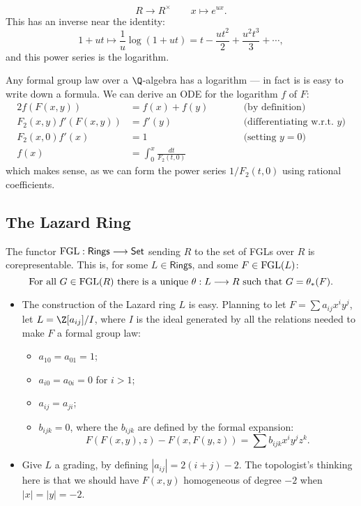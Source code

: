 \documentclass[11pt]{article}
\newcommand{\FGL}{\textup{FGL}}
\newcommand{\Ring}{\textsf{Rings}}
\begin{document}
\begin{Formal Group Laws}
\begin{itemise}
\begin{itemize}
\[R\to R^\times\qquad x\mapsto e^{ux}.\]
This has an inverse near the identity:
\[1+ut\mapsto\frac{1}{u}\log(1+ut)=t-\frac{ut^2}{2}+\frac{u^2t^3}{3}+\cdots,\]
and this power series is the logarithm.
\end{itemize}
Any formal group law over a $\Q$-algebra has a logarithm --- in fact is is easy to write down a formula. We can derive an ODE for the logarithm $f$ of $F$:
\begin{alignat*}{2}
f(F(x,y))&=
f(x)+f(y)%
&\qquad&\text{(by definition)}\\
F_{2}(x,y)f'(F(x,y))&=
f'(y)%
&\qquad&\text{(differentiating w.r.t.\ $y$)} \\
F_2(x,0)f'(x)&=
1%
&\qquad&\text{(setting $y=0$)} \\
f(x)&=
\int_0^x\frac{dt}{F_2(t,0)}%
 \end{alignat*}
which makes sense, as we can form the power series $1/F_2(t,0)$ using rational coefficients.

\end{itemise}
\subsection*{The Lazard Ring}
\begin{itemise}
\renewcommand{\labelitemii}{$\rightarrow$}
\item The functor $\FGL:\Ring\to\Set$ sending $R$ to the set of FGLs over $R$ is corepresentable. This is, for some $L\in\Ring$, and some $F\in\FGL(L)$:%
\[\textup{For all $G\in\FGL(R)$ there is a unique }\theta:L\to R\textup{ such that }G=\theta_*(F).\]
\begin{itemize}\squishlist
\item The construction of the Lazard ring $L$ is easy. Planning to let $F=\sum a_{ij}x^iy^j$, let $L=\Z[a_{ij}]/I$, where $I$ is the ideal generated by all the relations needed to make $F$ a formal group law:
\begin{itemize}\squishlist
\item $a_{10}=a_{01}=1$;%
\item $a_{i0}=a_{0i}=0$ for $i>1$;
\item $a_{ij}=a_{ji}$;%
\item $b_{ijk}=0$, where the $b_{ijk}$ are defined by the formal expansion:
\[F(F(x,y),z)-F(x,F(y,z))=\sum b_{ijk}x^iy^jz^k.\]
\end{itemize}
\item Give $L$ a grading, by defining $|a_{ij}|=2(i+j)-2$. The topologist's thinking here is that we should have $F(x,y)$ homogeneous of degree $-2$ when $|x|=|y|=-2$.
\end{itemize}
\end{itemise}

\end{Formal Group Laws}
\end{document}

